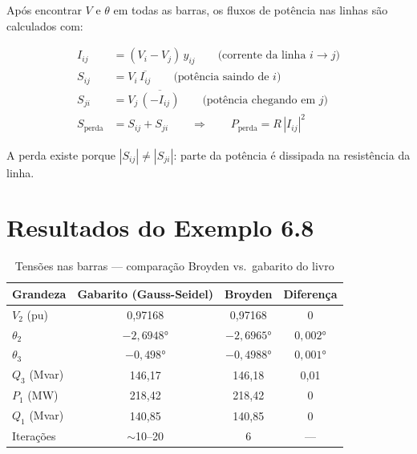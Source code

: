 \documentclass[
  12pt,
  a4paper,
  oneside,
  brazil
]{abntex2}
\begin{document}
Após encontrar $V$ e $\theta$ em todas as barras, os fluxos de potência
nas linhas são calculados com:

\begin{align}
  I_{ij} &= (V_i - V_j)\,y_{ij}
    \qquad \text{(corrente da linha } i \to j\text{)} \\
  S_{ij} &= V_i\,\overline{I_{ij}}
    \qquad \text{(potência saindo de }i\text{)} \\
  S_{ji} &= V_j\,\overline{(-I_{ij})}
    \qquad \text{(potência chegando em }j\text{)} \\
  S_{\text{perda}} &= S_{ij} + S_{ji}
    \qquad \Rightarrow \qquad
    P_{\text{perda}} = R\,|I_{ij}|^2
\end{align}

A perda existe porque $|S_{ij}| \neq |S_{ji}|$: parte da potência é
dissipada na resistência da linha.

\chapter{Resultados do Exemplo 6.8}

\begin{table}[h]
  \centering
  \caption{Tensões nas barras — comparação Broyden vs.\ gabarito do livro}
  \begin{tabular}{lccc}
    \toprule
    \textbf{Grandeza} & \textbf{Gabarito (Gauss-Seidel)} & \textbf{Broyden} & \textbf{Diferença} \\
    \midrule
    $V_2$ (pu)    & 0,97168         & 0,97168         & 0         \\
    $\theta_2$    & $-2{,}6948°$    & $-2{,}6965°$    & $0{,}002°$ \\
    $\theta_3$    & $-0{,}498°$     & $-0{,}4988°$    & $0{,}001°$ \\
    $Q_3$ (Mvar)  & 146,17          & 146,18          & 0,01      \\
    $P_1$ (MW)    & 218,42          & 218,42          & 0         \\
    $Q_1$ (Mvar)  & 140,85          & 140,85          & 0         \\
    \midrule
    Iterações     & $\sim$10--20    & 6               & ---       \\
    \bottomrule
  \end{tabular}
\end{table}
\end{document}
